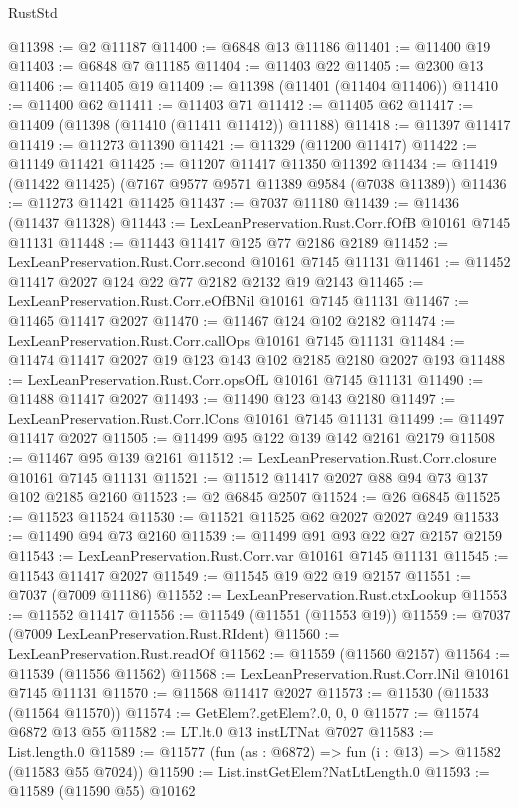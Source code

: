 \begin{lexlean}{RustStd}
\begin{coremodule}
@11398 := @2 @11187
@11400 := @6848 @13 @11186
@11401 := @11400 @19
@11403 := @6848 @7 @11185
@11404 := @11403 @22
@11405 := @2300 @13
@11406 := @11405 @19
@11409 := @11398 (@11401 (@11404 @11406))
@11410 := @11400 @62
@11411 := @11403 @71
@11412 := @11405 @62
@11417 := @11409 (@11398 (@11410 (@11411 @11412)) @11188)
@11418 := @11397 @11417
@11419 := @11273 @11390
@11421 := @11329 (@11200 @11417)
@11422 := @11149 @11421
@11425 := @11207 @11417 @11350 @11392
@11434 := @11419 (@11422 @11425) (@7167 @9577 @9571 @11389 @9584 (@7038 @11389))
@11436 := @11273 @11421 @11425
@11437 := @7037 @11180
@11439 := @11436 (@11437 @11328)
@11443 := LexLeanPreservation.Rust.Corr.fOfB @10161 @7145 @11131
@11448 := @11443 @11417 @125 @77 @2186 @2189
@11452 := LexLeanPreservation.Rust.Corr.second @10161 @7145 @11131
@11461 := @11452 @11417 @2027 @124 @22 @77 @2182 @2132 @19 @2143
@11465 := LexLeanPreservation.Rust.Corr.eOfBNil @10161 @7145 @11131
@11467 := @11465 @11417 @2027
@11470 := @11467 @124 @102 @2182
@11474 := LexLeanPreservation.Rust.Corr.callOps @10161 @7145 @11131
@11484 := @11474 @11417 @2027 @19 @123 @143 @102 @2185 @2180 @2027 @193
@11488 := LexLeanPreservation.Rust.Corr.opsOfL @10161 @7145 @11131
@11490 := @11488 @11417 @2027
@11493 := @11490 @123 @143 @2180
@11497 := LexLeanPreservation.Rust.Corr.lCons @10161 @7145 @11131
@11499 := @11497 @11417 @2027
@11505 := @11499 @95 @122 @139 @142 @2161 @2179
@11508 := @11467 @95 @139 @2161
@11512 := LexLeanPreservation.Rust.Corr.closure @10161 @7145 @11131
@11521 := @11512 @11417 @2027 @88 @94 @73 @137 @102 @2185 @2160
@11523 := @2 @6845 @2507
@11524 := @26 @6845
@11525 := @11523 @11524
@11530 := @11521 @11525 @62 @2027 @2027 @249
@11533 := @11490 @94 @73 @2160
@11539 := @11499 @91 @93 @22 @27 @2157 @2159
@11543 := LexLeanPreservation.Rust.Corr.var @10161 @7145 @11131
@11545 := @11543 @11417 @2027
@11549 := @11545 @19 @22 @19 @2157
@11551 := @7037 (@7009 @11186)
@11552 := LexLeanPreservation.Rust.ctxLookup
@11553 := @11552 @11417
@11556 := @11549 (@11551 (@11553 @19))
@11559 := @7037 (@7009 LexLeanPreservation.Rust.RIdent)
@11560 := LexLeanPreservation.Rust.readOf
@11562 := @11559 (@11560 @2157)
@11564 := @11539 (@11556 @11562)
@11568 := LexLeanPreservation.Rust.Corr.lNil @10161 @7145 @11131
@11570 := @11568 @11417 @2027
@11573 := @11530 (@11533 (@11564 @11570))
@11574 := GetElem?.getElem?.{0, 0, 0}
@11577 := @11574 @6872 @13 @55
@11582 := LT.lt.{0} @13 instLTNat @7027
@11583 := List.length.{0}
@11589 := @11577 (fun (as : @6872) => fun (i : @13) => @11582 (@11583 @55 @7024))
@11590 := List.instGetElem?NatLtLength.{0}
@11593 := @11589 (@11590 @55) @10162

\end{coremodule}
\end{lexlean}
